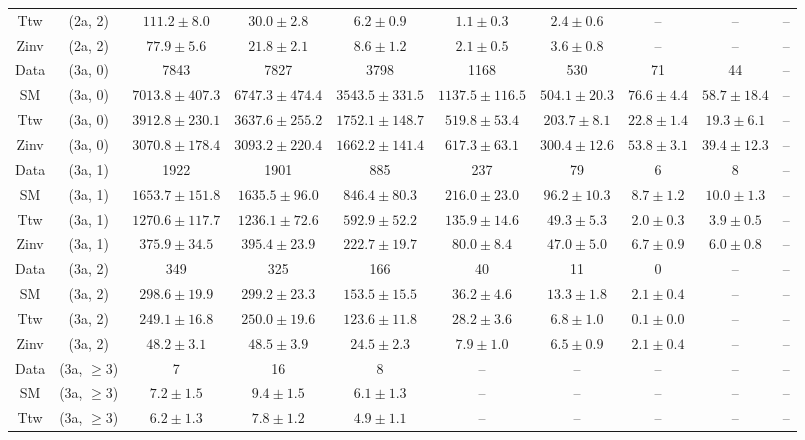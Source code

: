\begin{table}[h!]
{\begin{tabular}{cccccccccc}
	Ttw & (2a, 2) & $111.2\pm 8.0$ & $30.0\pm 2.8$ & $6.2\pm 0.9$ & $1.1\pm 0.3$ & $2.4\pm 0.6$ & -- & -- & -- \\[0.5ex] 
	Zinv & (2a, 2) & $77.9\pm 5.6$ & $21.8\pm 2.1$ & $8.6\pm 1.2$ & $2.1\pm 0.5$ & $3.6\pm 0.8$ & -- & -- & -- \\[0.5ex] 
	Data & (3a, 0) & 7843 & 7827 & 3798 & 1168 & 530 & 71 & 44 & -- \\[0.5ex] 
	SM & (3a, 0) & $7013.8\pm 407.3$ & $6747.3\pm 474.4$ & $3543.5\pm 331.5$ & $1137.5\pm 116.5$ & $504.1\pm 20.3$ & $76.6\pm 4.4$ & $58.7\pm 18.4$ & -- \\[0.5ex] 
	Ttw & (3a, 0) & $3912.8\pm 230.1$ & $3637.6\pm 255.2$ & $1752.1\pm 148.7$ & $519.8\pm 53.4$ & $203.7\pm 8.1$ & $22.8\pm 1.4$ & $19.3\pm 6.1$ & -- \\[0.5ex] 
	Zinv & (3a, 0) & $3070.8\pm 178.4$ & $3093.2\pm 220.4$ & $1662.2\pm 141.4$ & $617.3\pm 63.1$ & $300.4\pm 12.6$ & $53.8\pm 3.1$ & $39.4\pm 12.3$ & -- \\[0.5ex] 
	Data & (3a, 1) & 1922 & 1901 & 885 & 237 & 79 & 6 & 8 & -- \\[0.5ex] 
	SM & (3a, 1) & $1653.7\pm 151.8$ & $1635.5\pm 96.0$ & $846.4\pm 80.3$ & $216.0\pm 23.0$ & $96.2\pm 10.3$ & $8.7\pm 1.2$ & $10.0\pm 1.3$ & -- \\[0.5ex] 
	Ttw & (3a, 1) & $1270.6\pm 117.7$ & $1236.1\pm 72.6$ & $592.9\pm 52.2$ & $135.9\pm 14.6$ & $49.3\pm 5.3$ & $2.0\pm 0.3$ & $3.9\pm 0.5$ & -- \\[0.5ex] 
	Zinv & (3a, 1) & $375.9\pm 34.5$ & $395.4\pm 23.9$ & $222.7\pm 19.7$ & $80.0\pm 8.4$ & $47.0\pm 5.0$ & $6.7\pm 0.9$ & $6.0\pm 0.8$ & -- \\[0.5ex] 
	Data & (3a, 2) & 349 & 325 & 166 & 40 & 11 & 0 & -- & -- \\[0.5ex] 
	SM & (3a, 2) & $298.6\pm 19.9$ & $299.2\pm 23.3$ & $153.5\pm 15.5$ & $36.2\pm 4.6$ & $13.3\pm 1.8$ & $2.1\pm 0.4$ & -- & -- \\[0.5ex] 
	Ttw & (3a, 2) & $249.1\pm 16.8$ & $250.0\pm 19.6$ & $123.6\pm 11.8$ & $28.2\pm 3.6$ & $6.8\pm 1.0$ & $0.1\pm 0.0$ & -- & -- \\[0.5ex] 
	Zinv & (3a, 2) & $48.2\pm 3.1$ & $48.5\pm 3.9$ & $24.5\pm 2.3$ & $7.9\pm 1.0$ & $6.5\pm 0.9$ & $2.1\pm 0.4$ & -- & -- \\[0.5ex] 
	Data & (3a, $\ge3$) & 7 & 16 & 8 & -- & -- & -- & -- & -- \\[0.5ex] 
	SM & (3a, $\ge3$) & $7.2\pm 1.5$ & $9.4\pm 1.5$ & $6.1\pm 1.3$ & -- & -- & -- & -- & -- \\[0.5ex] 
	Ttw & (3a, $\ge3$) & $6.2\pm 1.3$ & $7.8\pm 1.2$ & $4.9\pm 1.1$ & -- & -- & -- & -- & -- \\[0.5ex] 

\end{tabular}}
\end{table}

